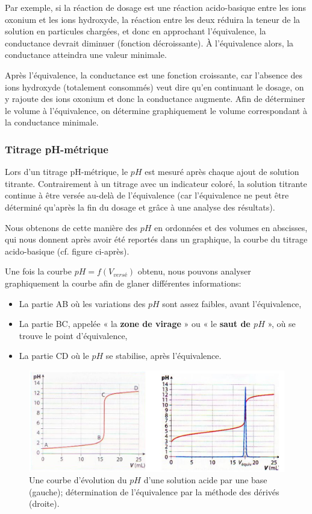 \documentclass[11pt,a4paper]{article}
\begin{document}
Par exemple, si la réaction de dosage est une réaction acido-basique entre les ions oxonium et les ions hydroxyde, la réaction entre les deux réduira la teneur de la solution en particules chargées, et donc en approchant l’équivalence, la conductance devrait diminuer (fonction décroissante).  À l’équivalence alors, la conductance atteindra une valeur minimale.  

Après l’équivalence, la conductance est une fonction croissante, car l’absence des ions hydroxyde (totalement consommés) veut dire qu’en continuant le dosage, on y rajoute des ions oxonium et donc la conductance augmente.  
Afin de déterminer le volume à l’équivalence, on détermine graphiquement le volume correspondant à la conductance minimale.  

\endgroup

\subsubsection{Titrage pH-métrique}

Lors d’un titrage pH-métrique, le $pH$ est mesuré après chaque ajout de solution titrante. Contrairement à un titrage avec un indicateur coloré, la solution titrante continue à être versée au-delà de l’équivalence (car l'équivalence ne peut être déterminé qu'après la fin du dosage et grâce à une analyse des résultats). 

Nous obtenons de cette manière des $pH$ en ordonnées et des volumes en abscisses, qui nous donnent après avoir été reportés dans un graphique, la courbe du titrage acido-basique (cf. figure ci-après). 

Une fois la courbe $pH = f\left(V_{versé}\right)$ obtenu, nous pouvons analyser graphiquement la courbe afin de glaner différentes informations: 

\begin{itemize}
    \item La partie AB où les variations des $pH$ sont assez faibles, avant l’équivalence, 
    \item La partie BC, appelée « la \textbf{zone de virage} » ou « le \textbf{saut de $pH$} », où se trouve le point d’équivalence, 
    \item La partie CD où le $pH$ se stabilise, après l’équivalence. 
\end{itemize}

\begin{figure}[h]
    \centering
    \includegraphics[width = \linewidth]{imgs/c1/methodederive.jpg}
    \caption{Une courbe d'évolution du $pH$ d'une solution acide par une base (gauche); détermination de l'équivalence par la méthode des dérivés (droite).}
    \label{fig:courbespH}
\end{figure}
\end{document}
